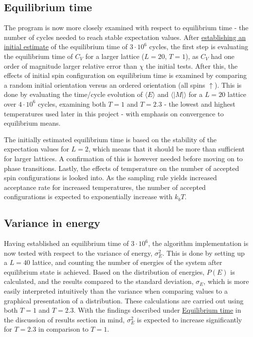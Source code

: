 \documentclass[%
oneside,                 %
final,                   %
10pt]{article}
\begin{document}
\subsection{Equilibrium time}
\label{SS:M.Eq.time}
The program is now more closely examined with respect to equilibrium time - the number of cycles needed to reach stable expectation values. After  \hyperref[SS:Disucssion_init_eval]{establishing an initial estimate} of the equilibrium time of $3\cdot 10^6$ cycles, the first step is evaluating the equilibrium time of $C_V$ for a larger lattice ($L=20$, $T=1$), as $C_V$ had one order of magnitude larger relative error than $\chi$ the initial tests. After this, the effects of initial spin configuration on equilibrium time is examined by comparing a random initial orientation versus an ordered orientation (all spins $\uparrow$). This is done by evaluating the time/cycle evolution of $\langle E \rangle$ and $\langle |M| \rangle$ for a $L=20$ lattice over $4 \cdot 10^6$ cycles, examining both $T=1$ and $T=2.3$ - the lowest and highest temperatures used later in this project - with emphasis on convergence to equilibrium means.  \newline

The initially estimated equilibrium time is based on the stability of the expectation values for $L=2$, which means that it should be more than sufficient for larger lattices. A confirmation of this is however needed before moving on to phase transitions. Lastly, the effects of temperature on the number of accepted spin configurations is looked into. As the sampling rule yields increased acceptance rate for increased temperatures, the number of accepted configurations is expected to exponentially increase with $k_b T$. 

 
\subsection{Variance in energy}
\label{SS:M.variance}
Having established an equilibrium time of $3 \cdot 10^6$, the algorithm implementation is now tested with respect to the variance of energy,  $\sigma_E^2$. This is done by setting up a $L=40$ lattice, and counting the number of energies of the system after equilibrium state is achieved. Based on the distribution of energies, $P(E)$ is calculated, and the results compared to the standard deviation, $\sigma_E$, which is more easily interpreted intuitively than the variance when comparing values to a graphical presentation of a distribution. These calculations are carried out using both $T=1$ and $T=2.3$. With the findings described under \hyperref[SS:Disucssion_eqtime]{Equilibrium time} in the discussion of results section in mind, $\sigma_E^2$ is expected to increase significantly for $T=2.3$ in comparison to $T=1$.
\end{document}
